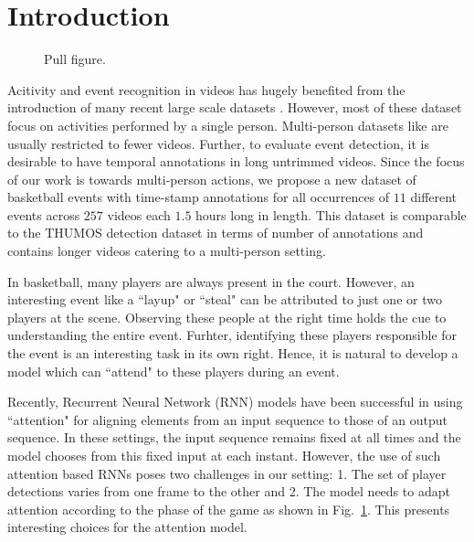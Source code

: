 
\section{Introduction}


\begin{figure}[ht!]
\begin{center}
\fbox{\rule{0pt}{2in} \rule{.9\linewidth}{0pt}}
\end{center}
   \caption{Pull figure.}
\label{fig:pull_figure}
\end{figure}

Acitivity and event recognition in videos has hugely benefited from the
introduction of many recent large scale datasets \cite{}. However, most of
these dataset focus on activities performed by a single person.  Multi-person
datasets like \cite{} are usually restricted to fewer videos.  Further, to
evaluate event detection, it is desirable to have temporal annotations in long
untrimmed videos. Since the focus of our work is towards multi-person actions,
we propose a new dataset of basketball events with time-stamp annotations for
all occurrences of $11$ different events across $257$ videos each $1.5$ hours
long in length.  This dataset is comparable to the THUMOS \cite{THUMOS}
detection dataset in terms of number of annotations and contains longer videos
catering to a multi-person setting.

In basketball, many players are always present in the court.
However, an interesting event like a ``layup" or ``steal" can be attributed
to just one or two players at the scene. Observing these people at the right
time holds the cue to understanding the entire event. Furhter, identifying
these players responsible for the event is an interesting task in its own right.
Hence, it is natural to develop a model which can ``attend" to these players during
an event.

Recently, Recurrent Neural Network (RNN) models have been successful in
using ``attention" \cite{Bahdnau_arxiv14,Xu_arxiv15,Yao_arxiv15} for aligning
elements from an input sequence to those of an output sequence. In these settings,
the input sequence remains fixed at all times and the model chooses from this
fixed input at each instant. However, the use of such attention based RNNs
poses two challenges in our setting:
1. The set of player detections varies from one frame to the other and
2. The model needs to adapt attention according to the phase of the game as
shown in Fig.~\ref{fig:pull_figure}. This presents interesting choices
for the attention model.

